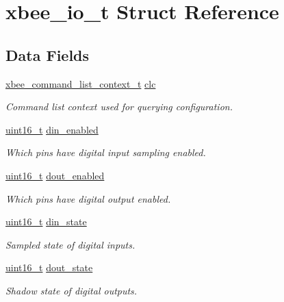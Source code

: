 \hypertarget{structxbee__io__t}{}\section{xbee\+\_\+io\+\_\+t Struct Reference}
\label{structxbee__io__t}
\subsection*{Data Fields}
\begin{DoxyCompactItemize}
\item 
\hyperlink{structxbee__command__list__context__t}{xbee\+\_\+command\+\_\+list\+\_\+context\+\_\+t} \hyperlink{group__xbee__io_ga55f4e774c0eb8d8dfbcdb7f1faff5ef6}{clc}
\begin{DoxyCompactList}\small\item\em Command list context used for querying configuration. \end{DoxyCompactList}\item 
\hyperlink{group__hal__dos_ga5a8b2dc9e45a9ee81a94ef304fb62505}{uint16\+\_\+t} \hyperlink{group__xbee__io_gabf150485c21c63b46d511cb50b2bf2df}{din\+\_\+enabled}
\begin{DoxyCompactList}\small\item\em Which pins have digital input sampling enabled. \end{DoxyCompactList}\item 
\hyperlink{group__hal__dos_ga5a8b2dc9e45a9ee81a94ef304fb62505}{uint16\+\_\+t} \hyperlink{group__xbee__io_gab9c5cc4d30d476f26698c96f9aa329fe}{dout\+\_\+enabled}
\begin{DoxyCompactList}\small\item\em Which pins have digital output enabled. \end{DoxyCompactList}\item 
\hyperlink{group__hal__dos_ga5a8b2dc9e45a9ee81a94ef304fb62505}{uint16\+\_\+t} \hyperlink{group__xbee__io_gaef89a704cd7723b8bac1e3f6f1abd71f}{din\+\_\+state}
\begin{DoxyCompactList}\small\item\em Sampled state of digital inputs. \end{DoxyCompactList}\item 
\hyperlink{group__hal__dos_ga5a8b2dc9e45a9ee81a94ef304fb62505}{uint16\+\_\+t} \hyperlink{group__xbee__io_gafffe3ca8d9c16b73247ec851e1c263ca}{dout\+\_\+state}
\begin{DoxyCompactList}\small\item\em Shadow state of digital outputs. \end{DoxyCompactList}\item 

\end{DoxyCompactItemize}
